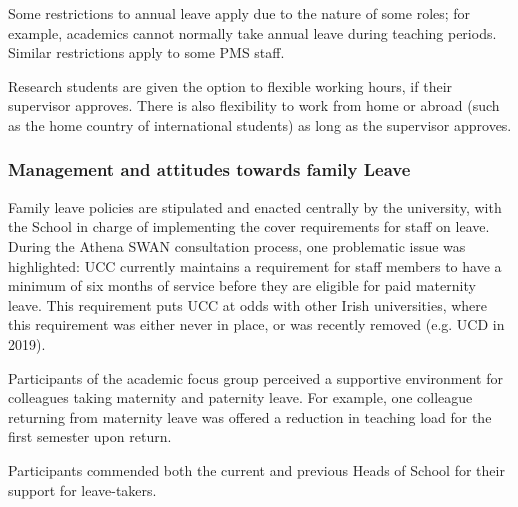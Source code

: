 

Some restrictions to annual leave apply due to the nature of some roles; for example, academics cannot normally take annual leave during teaching periods. Similar restrictions apply to some PMS staff. 

Research students are given the option to flexible working hours, if their supervisor approves. There is also flexibility to work from home or abroad (such as the home country of international students) as long as the supervisor approves.

\subsubsection{Management and attitudes towards family Leave}%

Family leave policies are stipulated and enacted centrally by the university, with the School  in charge of implementing the cover requirements for staff on leave. 
During the Athena SWAN consultation process, one problematic issue was highlighted:
UCC currently maintains a requirement for staff members to have a minimum of six months of service before they are eligible for paid maternity leave. This requirement puts UCC at odds with other Irish universities, where this requirement was either never in place, or was recently removed (e.g. UCD in 2019). 



Participants  of the academic focus group perceived a supportive environment for colleagues taking maternity and paternity leave. For example, one colleague returning from maternity leave was offered a reduction in teaching load for the first semester upon return. 

  
Participants commended both the current and previous Heads of School for their support for leave-takers. 

